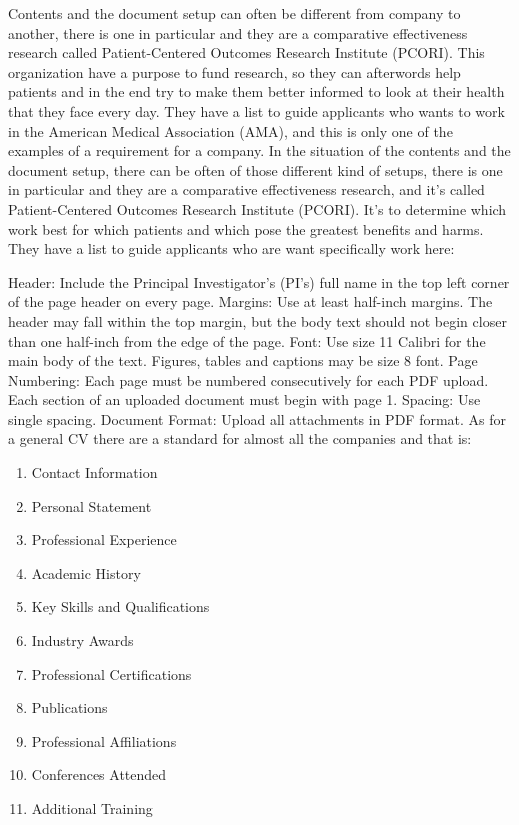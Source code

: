 Contents and the document setup can often be different from company to another,
there is one in particular and they are a comparative effectiveness research called
Patient-Centered Outcomes Research Institute (PCORI).
This organization have a purpose to fund research, so they can afterwords help patients and in the end try to make them better
informed to look at their health that they face every day.
They have a list to guide applicants who wants to work in the American Medical Association (AMA),
and this is only one of the examples of a requirement for a company.
In the situation of the contents and the document setup, there can be often of those different kind of setups,
there is one in particular and they are a comparative effectiveness research, and it's called
Patient-Centered Outcomes Research Institute (PCORI).
It's to determine which work best for which patients and which pose the greatest benefits and harms. %
They have a list to guide applicants who are want specifically work here:

Header: Include the Principal Investigator’s (PI’s) full name in the top left corner of the page header on every page.
Margins: Use at least half-inch margins. The header may fall within the top margin, but the body text should not begin closer than one half-inch from the edge of the page.
Font: Use size 11 Calibri for the main body of the text. Figures, tables and captions may be size 8 font.
Page Numbering: Each page must be numbered consecutively for each PDF upload. Each section of an uploaded document must begin with page 1.
Spacing: Use single spacing.
Document Format: Upload all attachments in PDF format.
As for a general CV there are a standard for almost all the companies and that is:
\begin{enumerate}

   \item Contact Information
   \item Personal Statement
   \item Professional Experience
   \item Academic History
   \item Key Skills and Qualifications
   \item Industry Awards
   \item Professional Certifications
   \item Publications
   \item Professional Affiliations
   \item Conferences Attended
   \item Additional Training
   \end{enumerate}

